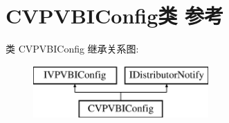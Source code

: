 \hypertarget{class_c_v_p_v_b_i_config}{}\section{C\+V\+P\+V\+B\+I\+Config类 参考}
\label{class_c_v_p_v_b_i_config}
类 C\+V\+P\+V\+B\+I\+Config 继承关系图\+:\begin{figure}[H]
\begin{center}
\leavevmode
\includegraphics[height=2.000000cm]{class_c_v_p_v_b_i_config}
\end{center}
\end{figure}
